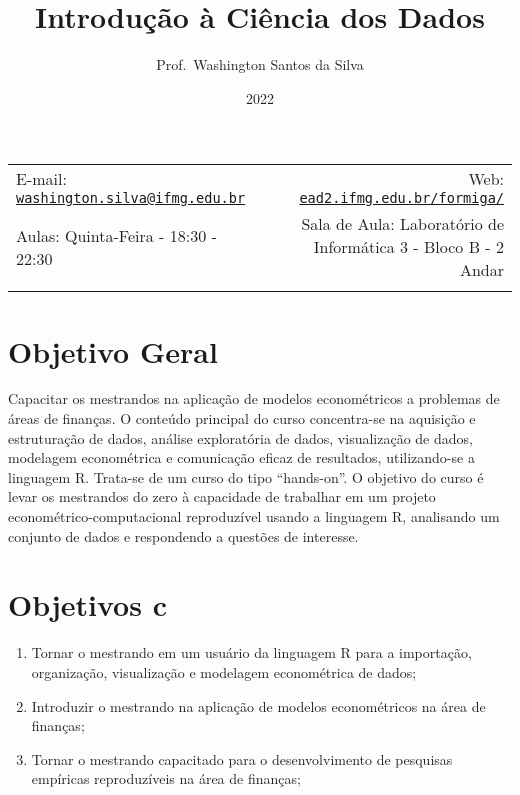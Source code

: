 \documentclass[11pt,]{article}
\title{Introdução à Ciência dos Dados}
\author{Prof.~Washington Santos da Silva}
\date{2022}
\begin{document}
  

		\maketitle
		
	
		\thispagestyle{firststyle}



	\noindent \begin{tabular*}{\textwidth}{ @{\extracolsep{\fill}} lr @{\extracolsep{\fill}}}


E-mail: \texttt{\href{mailto:washington.silva@ifmg.edu.br}{\nolinkurl{washington.silva@ifmg.edu.br}}} & Web: \href{http://ead2.ifmg.edu.br/formiga/}{\tt ead2.ifmg.edu.br/formiga/}\\
Aulas: Quinta-Feira - 18:30 - 22:30 & Sala de Aula: Laboratório de
Informática 3 - Bloco B - 2 Andar\\
	&  \\
	\hline
	\end{tabular*}
	
\vspace{2mm}
	


\hypertarget{objetivo-geral}{%
\section{Objetivo Geral}\label{objetivo-geral}}

Capacitar os mestrandos na aplicação de modelos econométricos a
problemas de áreas de finanças. O conteúdo principal do curso
concentra-se na aquisição e estruturação de dados, análise exploratória
de dados, visualização de dados, modelagem econométrica e comunicação
eficaz de resultados, utilizando-se a linguagem R. Trata-se de um curso
do tipo ``hands-on''. O objetivo do curso é levar os mestrandos do zero
à capacidade de trabalhar em um projeto econométrico-computacional
reproduzível usando a linguagem R, analisando um conjunto de dados e
respondendo a questões de interesse.

\hypertarget{objetivos-c}{%
\section{Objetivos c}\label{objetivos-c}}

\begin{enumerate}
\def\labelenumi{\arabic{enumi}.}
\item
  Tornar o mestrando em um usuário da linguagem R para a importação,
  organização, visualização e modelagem econométrica de dados;
\item
  Introduzir o mestrando na aplicação de modelos econométricos na área
  de finanças;
\item
  Tornar o mestrando capacitado para o desenvolvimento de pesquisas
  empíricas reproduzíveis na área de finanças;
\end{enumerate}
\end{document}
